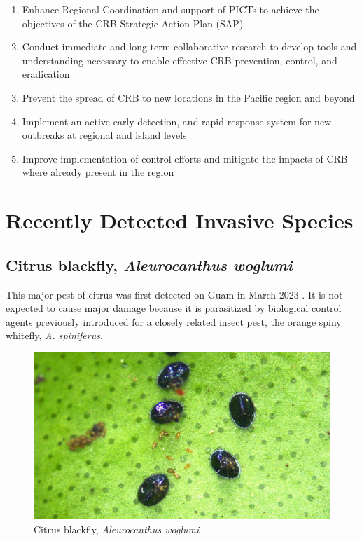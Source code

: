 \documentclass[twocolumn]{scrartcl}
\begin{document}
\begin{enumerate}
	\item Enhance Regional Coordination and support of PICTs to achieve the
	objectives of the CRB Strategic Action Plan (SAP)
	\item Conduct immediate and long-term collaborative research to develop
	tools and understanding necessary to enable effective CRB prevention, control, and
	eradication
	\item Prevent the spread of CRB to new locations in the Pacific region and
	beyond
	\item Implement an active early detection, and rapid response system for new
	outbreaks at regional and island levels
	\item Improve implementation of control efforts and mitigate the impacts of
	CRB where already present in the region
	
\end{enumerate} 

\section{Recently Detected Invasive Species}

\subsection{Citrus blackfly, \textit{Aleurocanthus woglumi}}

This major pest of citrus was first detected on Guam in March 2023 \cite{moore2023}. It is not expected to cause major damage because it is parasitized by biological control agents previously introduced for a closely related insect pest, the orange spiny whitefly, \textit{A. spiniferus}.

\begin{figure}[H]
	\centering
	\includegraphics[width=\linewidth]{images/woglumi}
	\caption{Citrus blackfly, \textit{Aleurocanthus woglumi}}
	\label{fig:woglumi}
\end{figure}
\end{document}
